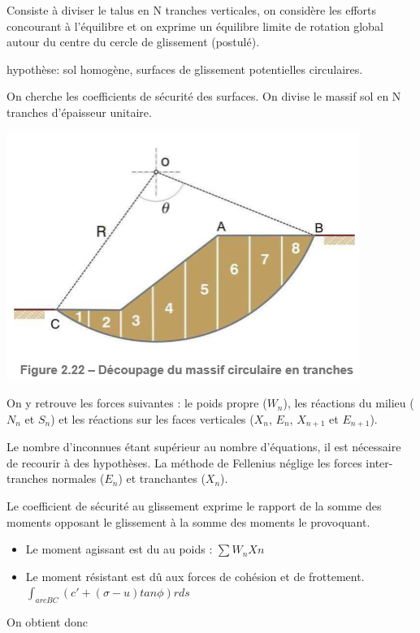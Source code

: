 Consiste à diviser le talus en N tranches verticales, on considère les efforts concourant à l'équilibre et on exprime un équilibre limite de rotation global autour du centre du cercle de glissement (postulé).

hypothèse: sol homogène, surfaces de glissement potentielles circulaires.

On cherche les coefficients de sécurité des surfaces. On divise le massif sol en N tranches d'épaisseur unitaire.

\begin{center}
\includegraphics [scale=0.5]{pictures/222.PNG}
\end{center}

On y retrouve les forces suivantes : le poids propre ($W_n$), les réactions du milieu ($N_n$ et $S_n$) et les réactions sur les faces verticales ($X_n$, $E_n$, $X_{n+1}$ et $E_{n+1}$).

Le nombre d'inconnues étant supérieur au nombre d'équations, il est nécessaire de recourir à des hypothèses. La méthode de Fellenius néglige les forces inter-tranches normales ($E_n$) et tranchantes ($X_n$).

Le coefficient de sécurité au glissement exprime le rapport de la somme des moments opposant le glissement à la somme des moments le provoquant. 
\begin{itemize}
    \item Le moment agissant est du au poids : $\sum W_n Xn$
    \item Le moment résistant est dû aux forces de cohésion et de frottement. $\int_{arcBC} (c'+(\sigma-u)tan\phi)rds$
\end{itemize} 

\medskip

On obtient donc 

